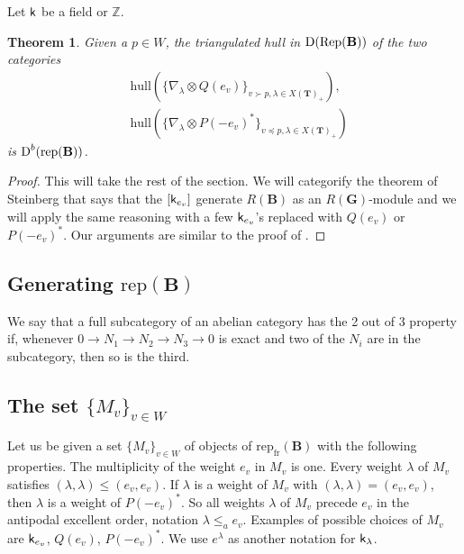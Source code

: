 \documentclass[sn-mathphys-num]{sn-jnl}%
\newcommand{\rep}{{\mathrm{rep}}}
\newcommand{\hull}{{\mathrm{hull}}}
\newcommand{\Rep}{{\mathrm{Rep}}}
\newcommand{\fr}{{\mathrm {fr}}}
\newcommand*{\Dd}{\mathop{\mathrm D\kern0pt}\nolimits}
\newcommand{\sk}{{\sf k}}
\newcommand{\Z}{{\mathbb Z}}
\newcommand{\bg}{\mathbf G}
\newcommand{\fb}{\mathbf B}
\newcommand{\bt}{\mathbf T}
\newtheorem{theorem}{Theorem}[section]
\theoremstyle{definition}
\begin{document}
Let $\sk$ be a field or $\Z$. 

\begin{theorem}\label{th:derived_generation}
Given a $p\in W$, the triangulated hull in $\Dd(\Rep(\fb))$ of the two categories
\begin{eqnarray*}
&\hull(\{\nabla_\lambda\otimes Q(e_v)\}_{v\succ p,\lambda\in X( \bt)_+}),\\
&\hull(\{\nabla_\lambda\otimes P(-e_v)^*\}_{v\preceq p,\lambda\in X( \bt)_+}) 
\end{eqnarray*}
is $\Dd^b (\rep ({\fb}))$.
\end{theorem}

\begin{proof}
This will take the rest of the section. We will categorify the theorem of Steinberg that says that
the $[\sk_{e_v}]$ generate $R(\fb)$ as an $R(\bg)$-module and we will apply the same reasoning with a few $\sk_{e_v}$'s replaced with $Q(e_v)$ or $P(-e_v)^*$. Our arguments are similar to the proof of \cite[Theorem 2]{Ana}.
\end{proof}

\subsection{Generating $\rep({\fb})$}\label{subsec:repB-generation}

  We say that a full subcategory of an abelian category has the 2 out of 3 property if,
  whenever $0\to N_1\to N_2 \to N_3 \to 0$ is exact and two of the $N_i$ are in the subcategory, then so is the third.
  
  \subsection{The set $\{M_v\}_{v\in W}$}
  
   Let us be given a set $\{M_v\}_{v\in W}$ of objects of $\rep_\fr({\fb})$  with the following properties.
  The multiplicity of the weight $e_v$ in $M_v$ is one. Every weight $\lambda$ of $M_v$ satisfies $(\lambda,\lambda)\leq (e_v,e_v)$.
  If $\lambda $ is a weight of $M_v$ with $(\lambda,\lambda)= (e_v,e_v)$, then  $\lambda$ is a weight of $P(-e_v)^*$. So all weights $\lambda$
  of $M_v$ precede $e_v$ in the antipodal excellent order, notation $\lambda\leq_ae_v$.
Examples of possible choices of $M_v$ are $\sk_{e_v}$, $Q(e_v)$, $P(-e_v)^*$.
  We use $e^\lambda$ as another notation for $\sk_\lambda$. 
  
\end{document}
